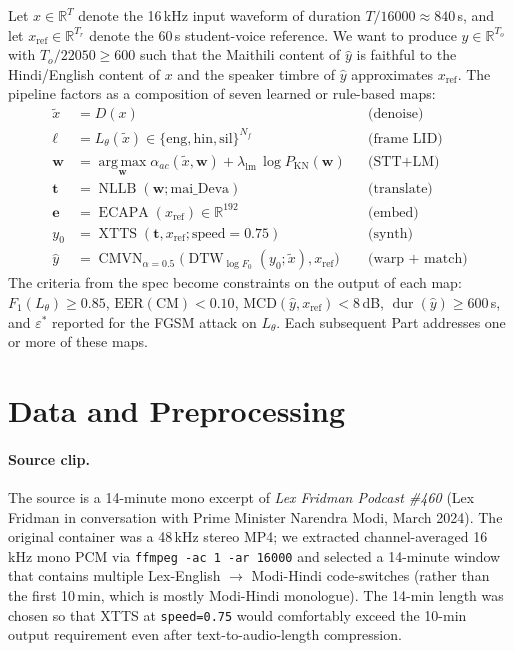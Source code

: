 \documentclass[conference]{IEEEtran}
\begin{document}
Let $x \in \mathbb{R}^{T}$ denote the 16\,kHz input waveform of duration
$T/16000 \approx 840$\,s, and let $x_{\text{ref}} \in \mathbb{R}^{T_r}$
denote the 60\,s student-voice reference. We want to produce
$\hat{y}\in\mathbb{R}^{T_o}$ with $T_o/22050\ge 600$ such that the Maithili
content of $\hat{y}$ is faithful to the Hindi/English content of $x$ and
the speaker timbre of $\hat{y}$ approximates $x_{\text{ref}}$. The
pipeline factors as a composition of seven learned or rule-based maps:
\begin{align*}
\tilde{x}      &= D(x) &&\text{(denoise)}\\
\mathbf{\ell}  &= L_\theta(\tilde{x}) \in \{\mathrm{eng,hin,sil}\}^{N_f}
                  &&\text{(frame LID)}\\
\mathbf{w}     &= \operatorname*{arg\,max}_{\mathbf{w}}
                  \alpha_{ac}(\tilde{x},\mathbf{w}) + \lambda_{\text{lm}}\,
                  \log P_{\mathrm{KN}}(\mathbf{w})
                  &&\text{(STT+LM)}\\
\mathbf{t}     &= \operatorname{NLLB}(\mathbf{w}; \text{mai\_Deva})
                  &&\text{(translate)}\\
\mathbf{e}     &= \operatorname{ECAPA}(x_{\text{ref}}) \in \mathbb{R}^{192}
                  &&\text{(embed)}\\
y_0            &= \operatorname{XTTS}(\mathbf{t}, x_{\text{ref}};
                  \text{speed}{=}0.75)
                  &&\text{(synth)}\\
\hat{y}        &= \operatorname{CMVN}_{\alpha=0.5}\!\big(
                  \operatorname{DTW}_{\log F_0}(y_0; \tilde{x}),
                  x_{\text{ref}}\big)
                  &&\text{(warp + match)}
\end{align*}
The criteria from the spec become constraints on the output of each map:
$F_1(L_\theta)\ge 0.85$, $\mathrm{EER}(\text{CM})<0.10$,
$\mathrm{MCD}(\hat{y}, x_{\text{ref}}) < 8$\,dB,
$\operatorname{dur}(\hat{y})\ge 600$\,s,
and $\varepsilon^{*}$ reported for the FGSM attack on $L_\theta$.
Each subsequent Part addresses one or more of these maps.

\section{Data and Preprocessing}

\paragraph*{Source clip.} The source is a 14-minute mono excerpt of
\textit{Lex Fridman Podcast \#460} (Lex Fridman in conversation with Prime
Minister Narendra Modi, March 2024). The original container was a 48\,kHz
stereo MP4; we extracted channel-averaged 16\,kHz mono PCM via
\texttt{ffmpeg -ac 1 -ar 16000} and selected a 14-minute window that
contains multiple Lex-English $\rightarrow$ Modi-Hindi code-switches
(rather than the first 10\,min, which is mostly Modi-Hindi monologue). The
14-min length was chosen so that XTTS at \texttt{speed=0.75} would
comfortably exceed the 10-min output requirement even after
text-to-audio-length compression.
\end{document}
